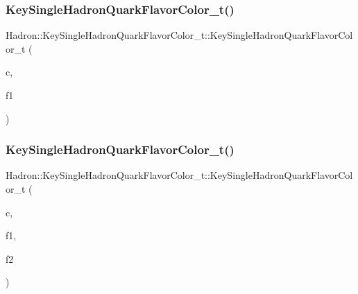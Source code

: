 \subsubsection{\texorpdfstring{KeySingleHadronQuarkFlavorColor\_t()}{KeySingleHadronQuarkFlavorColor\_t()}\hspace{0.1cm}{\footnotesize\ttfamily [7/15]}}
{\footnotesize\ttfamily Hadron\+::\+Key\+Single\+Hadron\+Quark\+Flavor\+Color\+\_\+t\+::\+Key\+Single\+Hadron\+Quark\+Flavor\+Color\+\_\+t (\begin{DoxyParamCaption}\item[{const std\+::string \&}]{c,  }\item[{const \mbox{\hyperlink{structHadron_1_1SingleHadronQuarkFlavor__t}{Single\+Hadron\+Quark\+Flavor\+\_\+t}} \&}]{f1 }\end{DoxyParamCaption})\hspace{0.3cm}{\ttfamily [inline]}}

\mbox{\label{structHadron_1_1KeySingleHadronQuarkFlavorColor__t_a1a1acbb421e0eee78a6102a9dc7027b6}} 
\subsubsection{\texorpdfstring{KeySingleHadronQuarkFlavorColor\_t()}{KeySingleHadronQuarkFlavorColor\_t()}\hspace{0.1cm}{\footnotesize\ttfamily [8/15]}}
{\footnotesize\ttfamily Hadron\+::\+Key\+Single\+Hadron\+Quark\+Flavor\+Color\+\_\+t\+::\+Key\+Single\+Hadron\+Quark\+Flavor\+Color\+\_\+t (\begin{DoxyParamCaption}\item[{const std\+::string \&}]{c,  }\item[{const \mbox{\hyperlink{structHadron_1_1SingleHadronQuarkFlavor__t}{Single\+Hadron\+Quark\+Flavor\+\_\+t}} \&}]{f1,  }\item[{const \mbox{\hyperlink{structHadron_1_1SingleHadronQuarkFlavor__t}{Single\+Hadron\+Quark\+Flavor\+\_\+t}} \&}]{f2 }\end{DoxyParamCaption})\hspace{0.3cm}{\ttfamily [inline]}}

